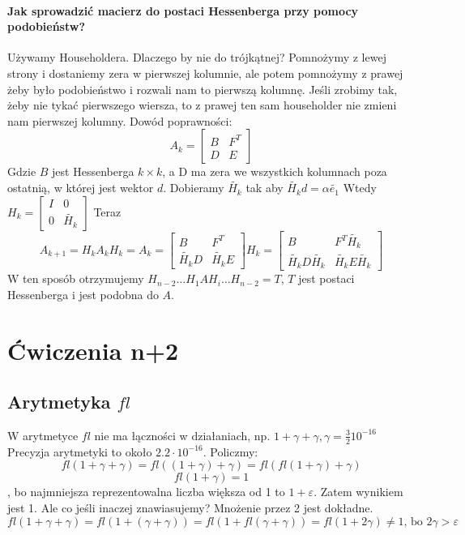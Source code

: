 \documentclass{article}
\begin{document}
\paragraph{Jak sprowadzić macierz do postaci Hessenberga przy pomocy podobieństw?}
Używamy Householdera. Dlaczego by nie do trójkątnej? Pomnożymy z lewej strony i dostaniemy zera w pierwszej kolumnie, ale potem pomnożymy z prawej żeby było podobieństwo i rozwali nam to pierwszą kolumnę. Jeśli zrobimy tak, żeby nie tykać pierwszego wiersza, to z prawej ten sam householder nie zmieni nam pierwszej kolumny. 
Dowód poprawności:
$$A_k=\begin{bmatrix}
	B&F^T\\
	D&E
\end{bmatrix}$$
Gdzie $ B $ jest Hessenberga $ k\times k$, a D ma zera we wszystkich kolumnach poza ostatnią, w której jest wektor $ d $.
Dobieramy $ \tilde{H_k} $ tak aby $ \tilde{H_k}d=\alpha \tilde{e_1} $
Wtedy $ H_k=\begin{bmatrix}
I&0\\
0&\tilde{H_k}
\end{bmatrix} $
Teraz $$
A_{k+1}=H_kA_kH_k=A_k=\begin{bmatrix}
B&F^T\\
\tilde{H_k}D&\tilde{H_k}E
\end{bmatrix}H_k=\begin{bmatrix}
B&F^T\tilde{H_k}\\
\tilde{H_k}D\tilde{H_k}&\tilde{H_k}E\tilde{H_k}
\end{bmatrix}
$$
W ten sposób otrzymujemy $ H_{n-2}\dots H_1AH_i\dots H_{n-2}=T $, $ T $ jest postaci Hessenberga i jest podobna do $ A $.
\section{Ćwiczenia n+2}
\subsection{Arytmetyka $ fl $}
W arytmetyce $ fl $ nie ma łączności w działaniach, np. 
$ 1+\gamma+\gamma, \gamma=\frac32 10^{-16} $
Precyzja arytmetyki to około $ 2.2\cdot 10^{-16} $. Policzmy: 
$$ fl(1+\gamma+\gamma)=fl((1+\gamma)+\gamma) = fl(fl(1+\gamma)+\gamma)$$
$$fl(1+\gamma)=1$$, bo najmniejsza reprezentowalna liczba większa od 1 to $ 1+\varepsilon $. Zatem wynikiem jest 1. Ale co jeśli inaczej znawiasujemy? Mnożenie przez 2 jest dokładne.
$$ fl(1+\gamma+\gamma)=fl(1+(\gamma+\gamma)) = fl(1+fl(\gamma+\gamma)) =fl(1+2\gamma) \not=1\text{, bo } 2\gamma>\varepsilon$$
\end{document}

